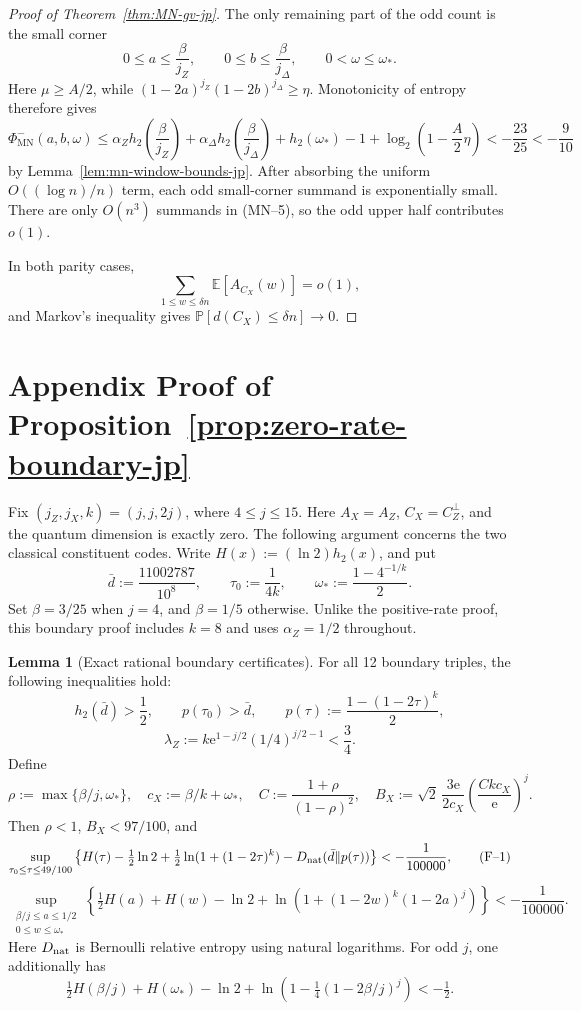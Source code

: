 \documentclass[11pt]{article}
\theoremstyle{definition}
\newtheorem{lemma}[theorem]{Lemma}
\newcommand{\engappendixsection}[2]{%
  \refstepcounter{section}%
  \section*{Appendix \thesection\quad #1}%
  \label{#2}%
}
\newcommand{\EE}{\mathbb E}
\newcommand{\PP}{\mathbb P}
\newcommand{\h}{h_2}
\newcommand{\CX}{C_X}
\begin{document}
\begin{proof}[Proof of Theorem~\ref{thm:MN-gv-jp}]
The only remaining part of the odd count is the small corner
\[
0\le a\le\frac\beta{j_Z},\qquad
0\le b\le\frac\beta{j_\Delta},\qquad
0<\omega\le\omega_*.
\]
Here \(\mu\ge A/2\), while
\((1-2a)^{j_Z}(1-2b)^{j_\Delta}\ge\eta\).  Monotonicity of entropy
therefore gives
\[
\Phi_{\mathrm{MN}}^-(a,b,\omega)
\le
\alpha_Z\h\!\left(\frac\beta{j_Z}\right)
+\alpha_\Delta\h\!\left(\frac\beta{j_\Delta}\right)
+\h(\omega_*)-1+\log_2\!\left(1-\frac A2\eta\right)
<-\frac{23}{25}< -\frac9{10}
\]
by Lemma~\ref{lem:mn-window-bounds-jp}.  After absorbing the uniform
\(O((\log n)/n)\) term, each odd small-corner summand is exponentially
small.  There are only \(O(n^3)\) summands in (MN--5), so the odd upper
half contributes \(o(1)\).

In both parity cases,
\[
\sum_{1\le w\le\delta n}\EE[A_{\CX}(w)]=o(1),
\]
and Markov's inequality gives
\(\PP[d(\CX)\le\delta n]\to0\).
\end{proof}


\engappendixsection{Proof of Proposition~\ref{prop:zero-rate-boundary-jp}}{app:zero-rate-boundary-jp}

Fix \((j_Z,j_X,k)=(j,j,2j)\), where \(4\le j\le15\). Here
\(A_X=A_Z\), \(C_X=C_Z^\perp\), and the quantum dimension is exactly zero.
The following argument concerns the two classical constituent codes.
Write \(H(x):=(\ln2)\h(x)\), and put
\[
\bar d:=\frac{11002787}{10^8},\qquad
\tau_0:=\frac1{4k},\qquad
\omega_*:=\frac{1-4^{-1/k}}2.
\]
Set \(\beta=3/25\) when \(j=4\), and \(\beta=1/5\) otherwise.
Unlike the positive-rate proof, this boundary proof includes \(k=8\)
and uses \(\alpha_Z=1/2\) throughout.

\begin{lemma}[Exact rational boundary certificates]\label{lem:boundary-certificates}
For all 12 boundary triples, the following inequalities hold:
\[
\h(\bar d)>\frac12,\qquad
p(\tau_0)>\bar d,\qquad
p(\tau):=\frac{1-(1-2\tau)^k}{2},
\]
\[
\lambda_Z:=k\mathrm e^{1-j/2}(1/4)^{j/2-1}<\frac34.
\]
Define
\[
\rho:=\max\{\beta/j,\omega_*\},\quad
c_X:=\beta/k+\omega_*,\quad
C:=\frac{1+\rho}{(1-\rho)^2},\quad
B_X:=\sqrt2\,\frac{3\mathrm e}{2c_X}
\left(\frac{Ckc_X}{\mathrm e}\right)^j.
\]
Then \(\rho<1\), \(B_X<97/100\), and
\[
\sup_{\tau_0\le\tau\le49/100}
\left\{H(\tau)-\tfrac12\ln2+
\tfrac12\ln(1+(1-2\tau)^k)-D_{\rm nat}(\bar d\|p(\tau))\right\}
<-\frac1{100000},                                      \tag{F--1}
\]
\[
\sup_{\substack{\beta/j\le a\le1/2\\0\le w\le\omega_*}}
\left\{\tfrac12 H(a)+H(w)-\ln2+
\ln(1+(1-2w)^k(1-2a)^j)\right\}
<-\frac1{100000}.                                      \tag{F--2}
\]
Here \(D_{\rm nat}\) is Bernoulli relative entropy using natural logarithms.
For odd \(j\), one additionally has
\[
\tfrac12H(\beta/j)+H(\omega_*)-\ln2+
\ln\left(1-\tfrac14(1-2\beta/j)^j\right)<-\tfrac12.       \tag{F--3}
\]
\end{lemma}
\end{document}
